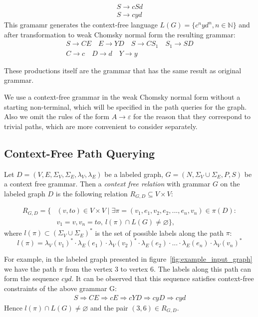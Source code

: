 \begin{align*}
S \rightarrow cSd\\
S \rightarrow cyd
\end{align*}
This gramamr generates the context-free language $L(G) = \{c^nyd^n, n \in \mathbb{N}\}$ and after transformation to weak Chomsky normal form the resulting grammar:
\begin{gather*}
S \rightarrow CE \quad E \rightarrow YD  \quad S \rightarrow CS_1 \quad S_1 \rightarrow SD \\
C \rightarrow c \quad D \rightarrow d \quad Y \rightarrow y
\end{gather*}

These productions itself are the grammar that has the same result as original grammar.

We use a context-free grammar in the weak Chomsky normal form without a starting non-terminal, which will be specified in the path queries for the graph. Also we omit the rules of the form $A \rightarrow \varepsilon$ for the reason that they correspond to trivial paths, which are more convenient to consider separately.

\subsection{Context-Free Path Querying}


\begin{definition}
Let $D = (V, E, \Sigma_V, \Sigma_E, \lambda_V, \lambda_E)$ be a labeled graph, $G = (N, \Sigma_V \cup \Sigma_E, P, S)$ be a context free grammar. Then a \emph{context free relation} with grammar $G$ on the labeled graph $D$ is the following relation $R_{G, D} \subseteq V \times V$:

\begin{equation*} \label{eq1}
\begin{split}
R_{G, D} = \{&(v, to) \in V \times V \mid \exists \pi = (v_1, e_1, v_2, e_2, ..., e_n, v_n) \in \pi(D): \\
      &v_1 = v, v_n = to,~l(\pi) \cap L(G) \neq \varnothing \},
\end{split}
\end{equation*}
where $l(\pi) \subset (\Sigma_V \cup \Sigma_E)^*$ is the set of possible labels along the path $\pi$:
$$l(\pi) = \lambda_V(v_1)^* \cdot \lambda_E(e_1) \cdot \lambda_V(v_2)^* \cdot \lambda_E(e_2) \cdot ... \cdot \lambda_E(e_n) \cdot \lambda_V(v_n)^*$$

For example, in the labeled graph presented in figure~\ref{fig:example_input_graph} we have the path $\pi$ from the vertex 3 to vertex 6. The labels along this path can form the sequence $cyd$. It can be observed that this sequence satisfies context-free constraints of the above grammar G:
    \begin{align*}
         S \Rightarrow CE \Rightarrow cE \Rightarrow cYD \Rightarrow cyD \Rightarrow cyd
    \end{align*}
    Hence $l(\pi) \cap L(G) \neq \varnothing$ and the pair $(3,6) \in R_{G, D}$.

\end{definition}

